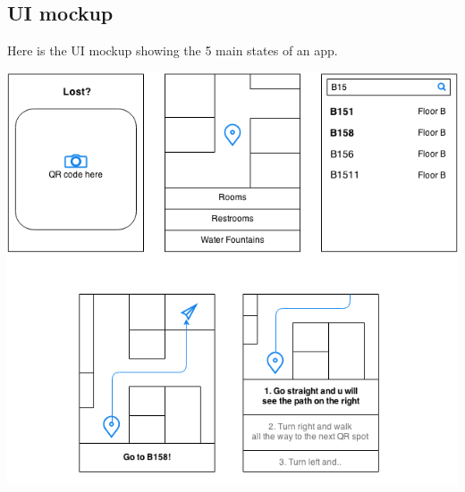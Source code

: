 \documentclass[12pt]{article}
\begin{document}
\subsection{UI mockup}
Here is the UI mockup showing the 5 main states of an app.

\begin{center}
\includegraphics[scale=0.6]{image/image03.png}
\end{center}
\end{document}
